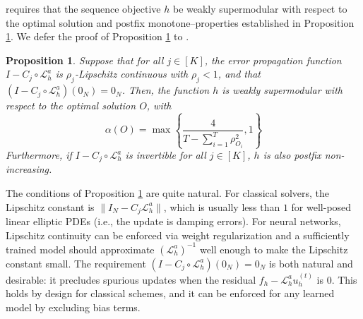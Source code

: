 \documentclass{article} %
\newtheorem{proposition}[theorem]{Proposition}
\begin{document}
 requires that the sequence objective $h$ be 
weakly supermodular with respect to the optimal solution and postfix monotone--properties established in Proposition \ref{th:weaklyalphasupermodular}. We defer the proof of Proposition \ref{th:weaklyalphasupermodular} to .

\begin{proposition} \label{th:weaklyalphasupermodular}
    Suppose that for all $j \in [K]$, the error propagation function $I - C_j \circ \mathcal{L}_h^a$ is $\rho_j$-Lipschitz continuous with $\rho_j < 1$, and that $(I - C_j \circ \mathcal{L}_h^a) (0_N) = 0_N$. Then, the function $h$ is weakly supermodular with respect to the optimal solution $O$, with $$\alpha(O) = \max\left\{\frac{4}{T - \sum_{i = 1}^{T} \rho_{O_i}^2} , 1\right\}$$Furthermore, if $I - C_j \circ \mathcal{L}_h^a$ is invertible for all $j \in [K]$, $h$ is also postfix non-increasing.
\end{proposition}
The conditions of Proposition \ref{th:weaklyalphasupermodular} are quite natural. For classical solvers, the Lipschitz constant is $\|I_N - C_j \mathcal{L}^a_h\|$, which is usually less than $1$
for well-posed linear elliptic PDEs (i.e., the update is damping errors). 
For neural networks, Lipschitz continuity can be enforced via weight regularization \citep{gouk2021regularisation} and a sufficiently trained model should approximate $(\mathcal{L}^a_h)^{-1}$ well enough to make the Lipschitz constant small.
The requirement $(I - C_j \circ \mathcal{L}_h^a) (0_N) = 0_N$
is both natural and desirable: it precludes spurious updates when the residual $f_h - \mathcal{L}^a_h u_h^{(t)}$ is $0$. This holds by design for classical schemes, and it can be enforced for any learned model by excluding bias terms.
\end{document}
